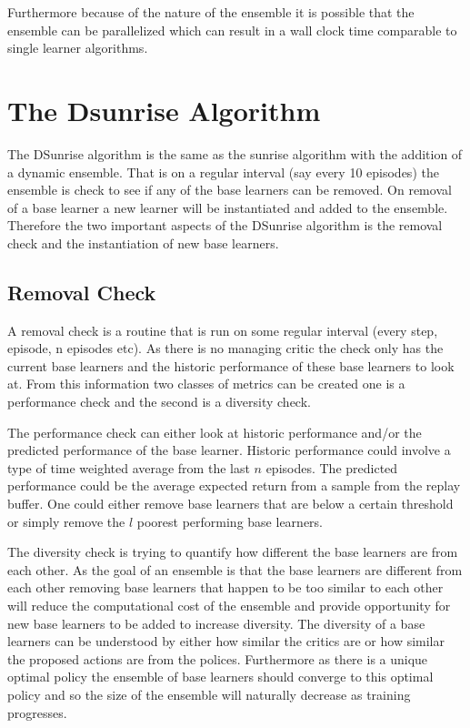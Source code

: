 \documentclass[12pt]{article}
\begin{document}
Furthermore because of the nature of the ensemble it is possible that the ensemble can be parallelized which can result in a wall clock time comparable to single learner algorithms.

\section{The Dsunrise Algorithm}

The DSunrise algorithm is the same as the sunrise algorithm with the addition of a dynamic ensemble. That is on a regular interval (say every 10 episodes) the ensemble is check to see if any of the base learners can be removed. On removal of a base learner a new learner will be instantiated and added to the ensemble. Therefore the two important aspects of the DSunrise algorithm is the removal check and the instantiation of new base learners.

\subsection{Removal Check}

A removal check is a routine that is run on some regular interval (every step, episode, n episodes etc). As there is no managing critic the check only has the current base learners and the historic performance of these base learners to look at. From this information two classes of metrics can be created one is a performance check and the second is a diversity check.

The performance check can either look at historic performance and/or the predicted performance of the base learner. Historic performance could involve a type of time weighted average from the last $n$ episodes. The predicted performance could be the average expected return from a sample from the replay buffer. One could either remove base learners that are below a certain threshold or simply remove the $l$ poorest performing base learners.

The diversity check is trying to quantify how different the base learners are from each other. As the goal of an ensemble is that the base learners are different from each other removing base learners that happen to be too similar to each other will reduce the computational cost of the ensemble and provide opportunity for new base learners to be added to increase diversity. The diversity of a base learners can be understood by either how similar the critics are or how similar the proposed actions are from the polices. Furthermore as there is a unique optimal policy the ensemble of base learners should converge to this optimal policy and so the size of the ensemble will naturally decrease as training progresses.
\end{document}
